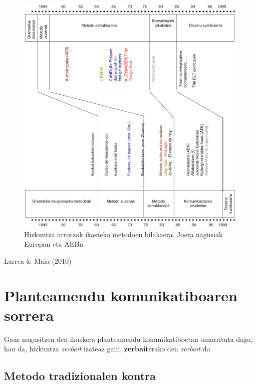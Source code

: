 \documentclass[
]{book}
\begin{document}
\begin{figure}
\centering
\includegraphics{assets/07/07-Hizkuntzak_ikasteko_metodoen_joerak.png}
\caption{Hizkuntza arrotzak ikasteko metodoen bilakaera. Joera nagusiak Europan eta AEBn}
\end{figure}

Larrea \& Maia (2010)

\hypertarget{planteamendu-komunikatiboaren-sorrera}{%
\section{Planteamendu komunikatiboaren sorrera}\label{planteamendu-komunikatiboaren-sorrera}}

Gaur nagusitzen den ikuskera planteamendu komunikatiboetan oinarrituta dago, hau da, hizkuntza \emph{zerbait} izateaz gain, \textbf{zerbait}erako den \emph{zerbait} da

\hypertarget{metodo-tradizionalen-kontra}{%
\subsection{Metodo tradizionalen kontra}\label{metodo-tradizionalen-kontra}}
\end{document}
